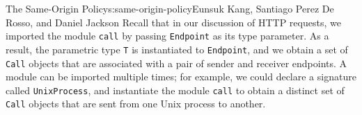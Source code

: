 \begin{aosachapter}{The Same-Origin Policy}{s:same-origin-policy}{Eunsuk Kang, Santiago Perez De Rosso, and Daniel Jackson}
Recall that in our discussion of HTTP requests, we imported the module
\texttt{call} by passing \texttt{Endpoint} as its type parameter. As a
result, the parametric type \texttt{T} is instantiated to
\texttt{Endpoint}, and we obtain a set of \texttt{Call} objects that are
associated with a pair of sender and receiver endpoints. A module can be
imported multiple times; for example, we could declare a signature
called \texttt{UnixProcess}, and instantiate the module \texttt{call} to
obtain a distinct set of \texttt{Call} objects that are sent from one
Unix process to another.

\end{aosachapter}
